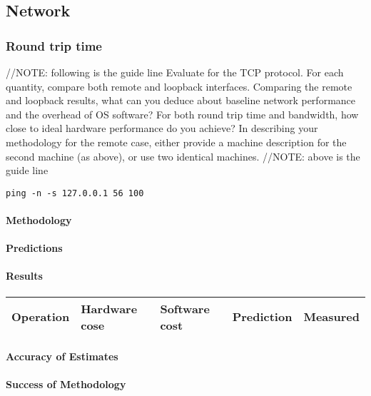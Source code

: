\subsection{Network}

\subsubsection{Round trip time}

//NOTE: following is the guide line
Evaluate for the TCP protocol. For each quantity, compare both remote and loopback interfaces. Comparing the remote and loopback results, what can you deduce about baseline network performance and the overhead of OS software? For both round trip time and bandwidth, how close to ideal hardware performance do you achieve? In describing your methodology for the remote case, either provide a machine description for the second machine (as above), or use two identical machines.
//NOTE: above is the guide line

\begin{verbatim}
ping -n -s 127.0.0.1 56 100 
\end{verbatim}

\paragraph{Methodology}
\paragraph{Predictions}
\paragraph{Results}

\begin{center}
\begin{tabular}{| l | l | l | l | l |}
\hline
Operation & Hardware cose & Software cost & Prediction & Measured \\
\hline
\end{tabular}
\end{center}

\paragraph{Accuracy of Estimates}
\paragraph{Success of Methodology}

